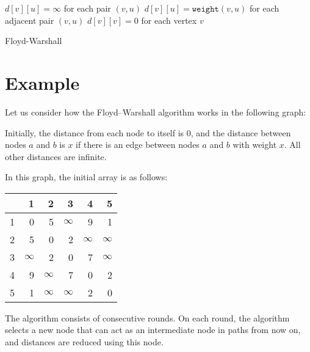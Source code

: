 \documentclass[twoside,12pt,a4paper,english]{book}
\theoremstyle{definition}
\theoremstyle{problemstyle}
\theoremstyle{problemstyle}
\theoremstyle{problemstyle}
\begin{document}
\begin{algorithm}[H]
\SetAlgoLined
{}
 $d[v][u] = \infty$ for each pair $(v,u)$\;
 $d[v][u] = \texttt{weight}(v,u)$ for each adjacent pair $(v,u)$\;
 $d[v][v] = 0$ for each vertex $v$\;
 \caption{Floyd-Warshall}
\end{algorithm}

\section{Example}

Let us consider how the Floyd–Warshall algorithm
works in the following graph:

\begin{center}
\end{center}

Initially, the distance from each node to itself is $0$,
and the distance between nodes $a$ and $b$ is $x$
if there is an edge between nodes $a$ and $b$ with weight $x$.
All other distances are infinite.

In this graph, the initial array is as follows:
\begin{center}
\begin{tabular}{r|rrrrr}
 & 1 & 2 & 3 & 4 & 5 \\
\hline
1 & 0 & 5 & $\infty$ & 9 & 1 \\
2 & 5 & 0 & 2 & $\infty$ & $\infty$ \\
3 & $\infty$ & 2 & 0 & 7 & $\infty$ \\
4 & 9 & $\infty$ & 7 & 0 & 2 \\
5 & 1 & $\infty$ & $\infty$ & 2 & 0 \\
\end{tabular}
\end{center}
\vspace{10pt}
The algorithm consists of consecutive rounds.
On each round, the algorithm selects a new node
that can act as an intermediate node in paths from now on,
and distances are reduced using this node.
\end{document}
